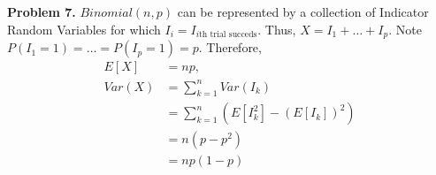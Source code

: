 \documentclass{article}
\begin{document}
\textbf{Problem 7.}
$Binomial(n,p)$ can be represented by a collection of Indicator Random Variables for which $I_{i} = I_{i\text{th trial succeds}}$. Thus, $X=I_1+ \dots + I_p$. 
Note $P(I_1=1) = \dots = P(I_p=1)=p$. Therefore, 
\begin{align}
    E[X] & = np, \\
    Var(X) & = \sum_{k=1}^{n}Var(I_k) \\
    & = \sum_{k=1}^{n} \left(E[I_k^2]-(E[I_k])^2\right) \\
    & = n(p-p^2) \\
    & = np(1-p)
\end{align}
\end{document}
